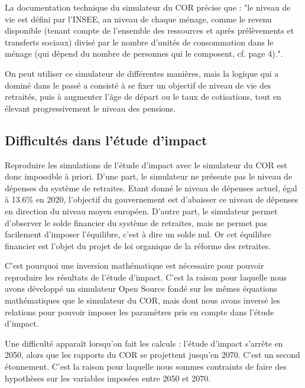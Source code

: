 \documentclass[10pt]{article}
\begin{document}
La documentation technique du simulateur du COR précise que : "le niveau de vie est défini 
par l’INSEE, au niveau de chaque ménage, comme le revenu disponible (tenant
compte de l’ensemble des ressources et après prélèvements et transferts sociaux) divisé par le nombre
d’unités de consommation dans le ménage (qui dépend du nombre de personnes qui le composent, cf.
page 4).". 

On peut utiliser ce simulateur de différentes manières, mais la 
logique qui a dominé dans le passé a consisté à se fixer un objectif 
de niveau de vie des retraités, puis à augmenter l'âge de départ ou 
le taux de cotisations, tout en élevant progressivement le niveau des pensions. 


\subsection{Difficultés dans l'étude d'impact}

Reproduire les simulations de l'étude d'impact avec le simulateur du COR 
est donc impossible à priori. 
D'une part, le simulateur ne présente pas le niveau de dépenses du système 
de retraites. 
Etant donné le niveau de dépenses actuel, égal à 13.6\% en 2020, 
l'objectif du gouvernement est d'abaisser ce niveau de dépenses 
en direction du niveau moyen européen. 
D'autre part, le simulateur permet d'observer le solde financier du système de retraites, 
mais ne permet pas facilement d'imposer l'équilibre, c'est à dire un solde nul. 
Or cet équilibre financier est l'objet du projet de loi organique de la réforme 
des retraites. 

C'est pourquoi une inversion mathématique est nécessaire pour pouvoir reproduire 
les résultats de l'étude d'impact. 
C'est la raison pour laquelle nous avons développé un simulateur Open Source 
\cite{SimulateurScherrer} fondé sur les mêmes équations mathématiques 
que le simulateur du COR, mais dont nous avons inversé les relations pour 
pouvoir imposer les paramètres pris en compte dans l'étude d'impact. 

Une difficulté apparaît lorsqu'on fait les calculs : 
l'étude d'impact s'arrête en 2050, alors que les rapports du COR 
se projettent jusqu'en 2070. 
C'est un second étonnement. 
C'est la raison pour laquelle nous sommes contraints de faire des 
hypothèses sur les variables imposées entre 2050 et 2070. 

\end{document}
